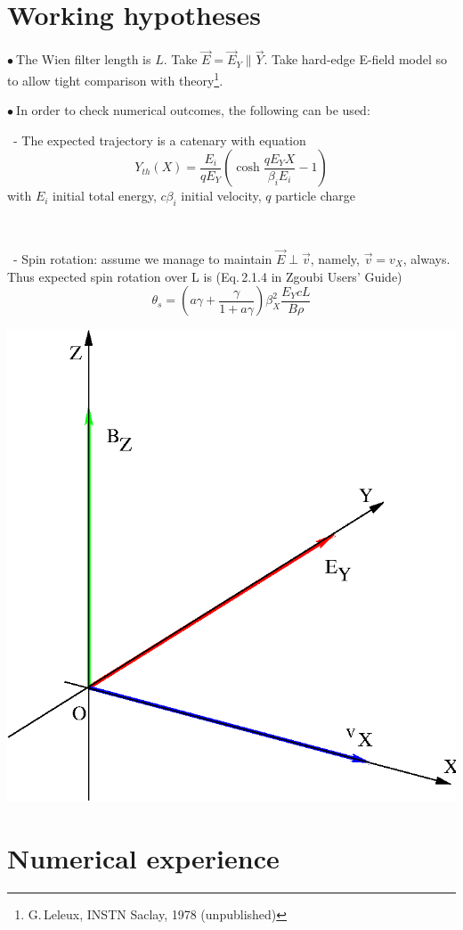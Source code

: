 \documentclass[10pt]{article}
\newcommand{\nib}{\noindent \ensuremath{\bullet~}}
\newcommand{\nin}{\noindent~}
\begin{document}
\section*{Working hypotheses}

\nib The Wien filter length is $ L$. Take $ \vec E =\vec E_Y \parallel \vec Y$.
Take  hard-edge E-field model  so to allow tight comparison with theory\footnote{G.\,Leleux, INSTN Saclay, 1978 (unpublished)}.

\nib In order to check numerical outcomes, the following can be used:

\begin{minipage}{.69\linewidth}
\nin - The expected trajectory is a catenary with equation
%  
$$ Y_{th}(X) = \frac{E_i}{qE_Y} \left( \cosh \dfrac{qE_Y X}{\beta_i E_i } -1 \right)$$
with $E_i$  initial total energy, $c\beta_i$ initial velocity, $q$  particle charge

~

\nin -  Spin rotation: assume we manage to maintain $\vec E \perp \vec v$, namely, $\vec v = v_X$, always. Thus expected spin rotation over L  is (Eq.\,2.1.4 in Zgoubi Users' Guide)
$$ \theta_s = (a\gamma+\dfrac{\gamma}{1+a\gamma})\beta_X^2 \dfrac{E_YcL}{B\rho}  $$

\end{minipage} \hfill
\begin{minipage}{.3\linewidth}
  \includegraphics[width=0.75\linewidth]{wienF.eps}
\end{minipage}


\section*{ Numerical experience }
\end{document}
